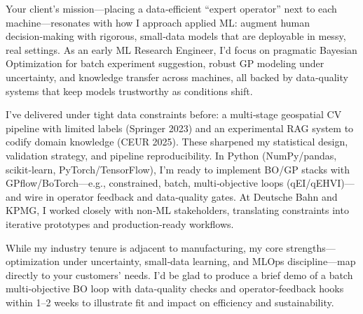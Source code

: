 Your client’s mission—placing a data‑efficient “expert operator” next to each machine—resonates with how I approach applied ML: augment human decision‑making with rigorous, small‑data models that are deployable in messy, real settings. As an early ML Research Engineer, I’d focus on pragmatic Bayesian Optimization for batch experiment suggestion, robust GP modeling under uncertainty, and knowledge transfer across machines, all backed by data‑quality systems that keep models trustworthy as conditions shift.

I’ve delivered under tight data constraints before: a multi‑stage geospatial CV pipeline with limited labels (Springer 2023) and an experimental RAG system to codify domain knowledge (CEUR 2025). These sharpened my statistical design, validation strategy, and pipeline reproducibility. In Python (NumPy/pandas, scikit‑learn, PyTorch/TensorFlow), I’m ready to implement BO/GP stacks with GPflow/BoTorch—e.g., constrained, batch, multi‑objective loops (qEI/qEHVI)—and wire in operator feedback and data‑quality gates. At Deutsche Bahn and KPMG, I worked closely with non‑ML stakeholders, translating constraints into iterative prototypes and production‑ready workflows.

While my industry tenure is adjacent to manufacturing, my core strengths—optimization under uncertainty, small‑data learning, and MLOps discipline—map directly to your customers’ needs. I’d be glad to produce a brief demo of a batch multi‑objective BO loop with data‑quality checks and operator‑feedback hooks within 1–2 weeks to illustrate fit and impact on efficiency and sustainability.